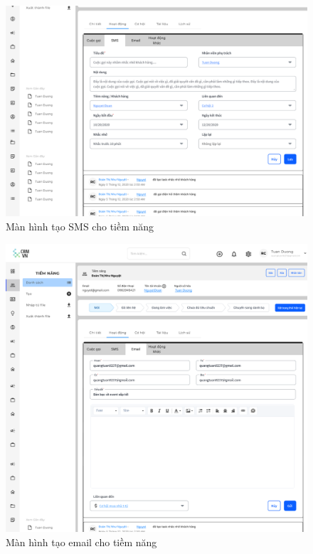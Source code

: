 \documentclass[12pt,a4paper]{article}
\begin{document}
\begin{enumerate}
\begin{itemize}
            \begin{figure}[H]
                \centering \includegraphics[width=\textwidth]{Img/Nguyet/smstn.png}
                \vspace{0.5cm}
                \caption{Màn hình tạo SMS cho tiềm năng}
                \label{smstn}
            \end{figure}

            \begin{figure}[H]
                \centering \includegraphics[width=\textwidth]{Img/Nguyet/emailtn.png}
                \vspace{0.5cm}
                \caption{Màn hình tạo email cho tiềm năng}
                \label{emailtn}
            \end{figure}



\end{itemize}
\end{enumerate}
\end{document}
